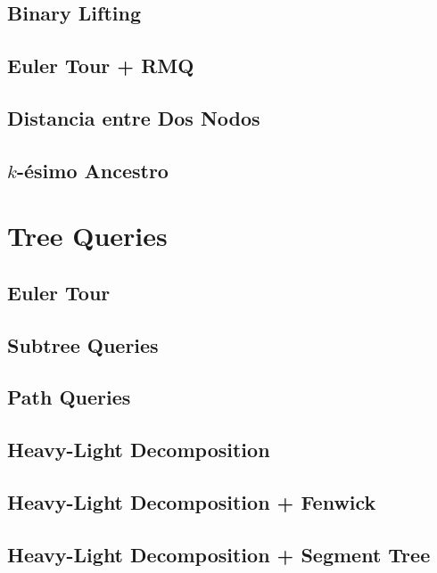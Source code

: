 \documentclass[10pt,a4paper,twocolumn]{article}
\begin{document}
\subsection{Binary Lifting}

\subsection{Euler Tour + RMQ}

\subsection{Distancia entre Dos Nodos}

\subsection{$k$-ésimo Ancestro}



\section{Tree Queries}

\subsection{Euler Tour}

\subsection{Subtree Queries}

\subsection{Path Queries}

\subsection{Heavy-Light Decomposition}

\subsection{Heavy-Light Decomposition + Fenwick}

\subsection{Heavy-Light Decomposition + Segment Tree}
\end{document}
